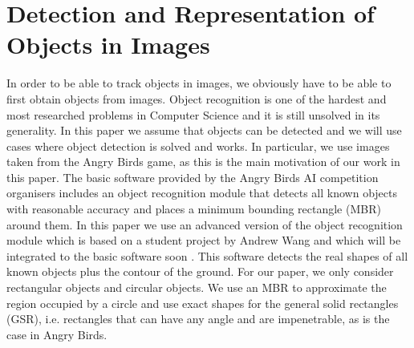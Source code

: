\documentclass[letterpaper]{article}
\begin{document}
\section{Detection and Representation of Objects in Images}

In order to be able to track objects in images, we obviously have to be able to first obtain objects from images. Object recognition \cite{belongie2002shape,lowe1999object} is one of the hardest and most researched problems in Computer Science and it is still unsolved in its generality. In this paper we assume that objects can be detected and we will use cases where object detection is solved and works. In particular, we use images taken from the Angry Birds game, as this is the main motivation of our work in this paper. 
The basic software provided by the Angry Birds AI competition organisers includes an object recognition module that detects all known objects with reasonable accuracy and places a minimum bounding rectangle (MBR) around them. In this paper we use an advanced version of the object recognition module which is based on a student project by Andrew Wang and which will be integrated to the basic software soon \cite{andrewwang}. This software detects the real shapes of all known objects plus the contour of the ground. For our paper, we only consider rectangular objects and circular objects. We use an MBR to approximate the region occupied by a circle and use exact shapes for the general solid rectangles (GSR), i.e. rectangles that can have any angle and are impenetrable, as is the case in Angry Birds. 
\end{document}

